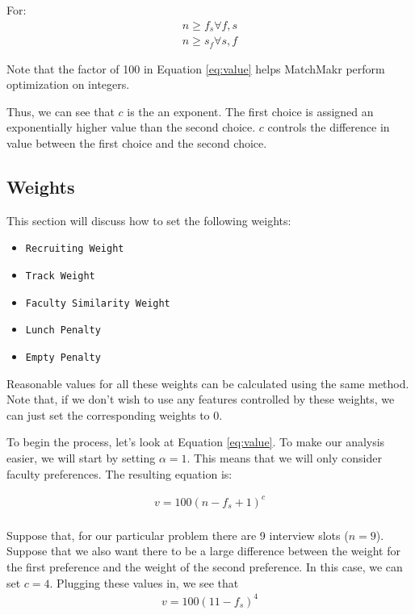 For:
\begin{equation}
	\label{eq:n}
	\begin{aligned}
		n \ge f_s \forall f, s \\
		n \ge s_f \forall s, f		
	\end{aligned}
\end{equation}

Note that the factor of 100 in Equation \ref{eq:value} helps MatchMakr perform optimization on integers.

Thus, we can see that $c$ is the an exponent. The first choice is assigned an exponentially higher value than the second choice.  $c$ controls the difference in value between the first choice and the second choice.

\pagebreak
\subsection{Weights}

This section will discuss how to set the following weights:
\begin{itemize}
	\item \texttt{Recruiting Weight}
	\item \texttt{Track Weight}
	\item \texttt{Faculty Similarity Weight}
	\item \texttt{Lunch Penalty}
	\item \texttt{Empty Penalty}
\end{itemize}

Reasonable values for all these weights can be calculated using the same method.  Note that, if we don't wish to use any features controlled by these weights, we can just set the corresponding weights to 0.

To begin the process, let's look at Equation \ref{eq:value}.  To make our analysis easier, we will start by setting $\alpha = 1$.  This means that we will only consider faculty preferences.  The resulting equation is:

\begin{equation}
	\begin{aligned}
		v = 100 (n - f_s + 1)^c  \\
	\end{aligned}
\end{equation}

Suppose that, for our particular problem there are 9 interview slots ($n=9$).  Suppose that we also want there to be a large difference between the weight for the first preference and the weight of the second preference.  In this case, we can set $c=4$.  Plugging these values in, we see that
\begin{equation}
	\begin{aligned}
		v = 100 (11 - f_s)^4  \\
	\end{aligned}
\end{equation}


